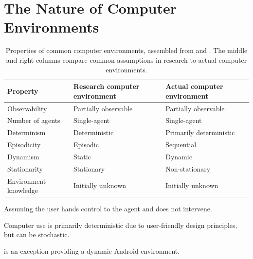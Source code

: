 \section{The Nature of Computer Environments}\label{sec:domain_view:nature}

\begin{table}
\begin{threeparttable}
    \caption{Properties of common computer environments, assembled from \citet[Chapter~2]{russell_artificial_2022} and \citet[Chapter~2.3]{sutton_reinforcement_2018}. The middle and right columns compare common assumptions in research to actual computer environments.}
    \label{table:environment-property}

    \begin{tabular}{>{\raggedright\arraybackslash}p{4.3cm} >{\raggedright\arraybackslash}p{4cm} >{\raggedright\arraybackslash}p{4cm}}
    \toprule
    \textbf{Property}   & \textbf{Research computer \newline environment}   & \textbf{Actual computer \newline environment}     \\ %
    \midrule
    Observability                & Partially observable                                  & Partially observable      \\ 
    Number of agents             & Single-agent                                          & Single-agent\tnote{a}     \\ 
    Determinism                  & Deterministic                                         & Primarily deterministic\tnote{b}   \\ 
    Episodicity                 & Episodic                                              & Sequential                \\ 
    Dynamism                     & Static\tnote{c}                                       & Dynamic                   \\ 
    Stationarity                & Stationary                                            & Non-stationary            \\ 
    Environment knowledge       & Initially unknown                                    & Initially unknown          \\ 
    \bottomrule
    \end{tabular}
    \begin{tablenotes}
        \footnotesize
        \item[a] Assuming the user hands control to the agent and does not intervene.
        \item[b] Computer use is primarily deterministic due to user-friendly design principles, but can be stochastic.
        \item[c] \citet{toyama_androidenv_2021} is an exception providing a dynamic Android environment.
    \end{tablenotes}
\end{threeparttable}
\end{table}

